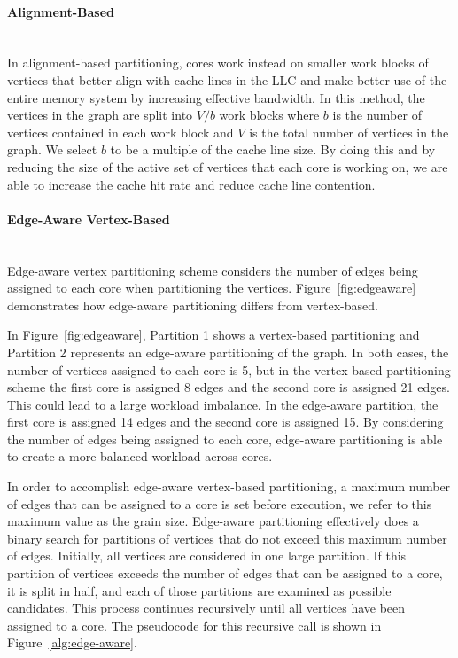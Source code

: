 \paragraph{Alignment-Based} \mbox{}\\
In alignment-based partitioning, cores work instead on smaller work blocks of vertices that better align with cache lines in the LLC and make better use of the entire memory system by increasing effective bandwidth.
In this method, the vertices in the graph are split into $V/b$ work blocks where $b$ is the number of vertices contained in each work block and $V$ is the total number of vertices in the graph. We select $b$ to be a multiple of the cache line size. By doing this and by reducing the size of the active set of vertices that each core is working on, we are able to increase the cache hit rate and reduce cache line contention.


\paragraph{Edge-Aware Vertex-Based}\mbox{}\\
\edgeAwareMethodFigure
Edge-aware vertex partitioning scheme considers the number of edges being assigned to each core when partitioning the vertices.
Figure~\ref{fig:edgeaware} demonstrates how edge-aware partitioning differs from vertex-based.

In Figure~\ref{fig:edgeaware}, Partition 1 shows a vertex-based partitioning and Partition 2 represents an edge-aware partitioning of the graph.
In both cases, the number of vertices assigned to each core is 5, but in the vertex-based partitioning scheme the first core is assigned 8 edges and the second core is assigned 21 edges.
This could lead to a large workload imbalance.
In the edge-aware partition, the first core is assigned 14 edges and the second core is assigned 15.
By considering the number of edges being assigned to each core, edge-aware partitioning is able to create a more balanced workload across cores.

\edgeAwareMethodAlgorithm

In order to accomplish edge-aware vertex-based partitioning, a maximum number of edges that can be assigned to a core is set before execution, we refer to this maximum value as the grain size.
Edge-aware partitioning effectively does a binary search for partitions of vertices that do not exceed this maximum number of edges. 
Initially, all vertices are considered in one large partition.
If this partition of vertices exceeds the number of edges that can be assigned to a core, it is split in half, and each of those partitions are examined as possible candidates.
This process continues recursively until all vertices have been assigned to a core.
The pseudocode for this recursive call is shown in Figure~\ref{alg:edge-aware}.


